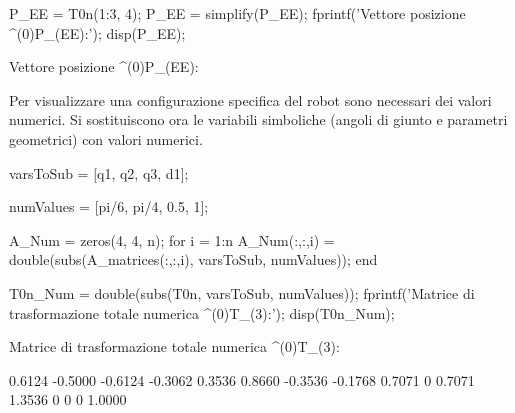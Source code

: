 \documentclass[11pt, a4paper]{article}
\begin{document}
\begin{matlabcode}
P_EE = T0n(1:3, 4);
P_EE = simplify(P_EE);
fprintf('Vettore posizione ^(0)P_(EE):\n');
disp(P_EE);
\end{matlabcode}
\begin{matlaboutput}
Vettore posizione ^(0)P_(EE):
\end{matlaboutput}

\begin{par}
\newpage
\begin{flushleft}
Per visualizzare una configurazione specifica del robot sono necessari dei valori numerici. Si sostituiscono ora le variabili simboliche (angoli di giunto e parametri geometrici) con valori numerici.
\end{flushleft}
\end{par}

\begin{matlabcode}
varsToSub = [q1, q2, q3, d1];

numValues = [pi/6, pi/4, 0.5, 1];

A_Num = zeros(4, 4, n);
for i = 1:n
    A_Num(:,:,i) = double(subs(A_matrices(:,:,i), varsToSub, numValues));
end

T0n_Num = double(subs(T0n, varsToSub, numValues));
fprintf('Matrice di trasformazione totale numerica ^(0)T_(3):\n');
disp(T0n_Num);
\end{matlabcode}
\begin{matlaboutput}
Matrice di trasformazione totale numerica ^(0)T_(3):
\end{matlaboutput}
\begin{matlaboutput}
    0.6124   -0.5000   -0.6124   -0.3062
    0.3536    0.8660   -0.3536   -0.1768
    0.7071         0    0.7071    1.3536
         0         0         0    1.0000
\end{matlaboutput}
\end{document}
